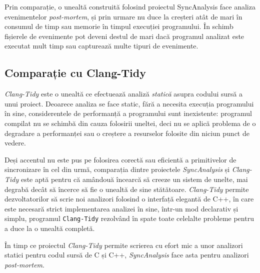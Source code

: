 Prin comparație, o unealtă construită folosind proiectul SyncAnalysis
face analiza evenimentelor \textit{post-mortem}, și prin urmare nu duce
la creșteri atât de mari în consumul de timp sau memorie în timpul
execuției programului. În schimb fișierele de evenimente pot deveni
destul de mari dacă programul analizat este executat mult timp sau
capturează multe tipuri de evenimente.

\subsection{Comparație cu Clang-Tidy}
\textit{Clang-Tidy}\cite{ClangTidy} este o unealtă ce efectuează analiză
\textit{statică} asupra codului sursă a unui proiect. Deoarece analiza
se face static, fără a necesita execuția programului în sine,
considerentele de performanță a programului sunt inexistente: programul
compilat nu se schimbă din cauza folosirii uneltei, deci nu se aplică
problema de o degradare a performanței sau o creștere a resurselor
folosite din niciun punct de vedere.

Deși accentul nu este pus pe folosirea corectă sau eficientă a
primitivelor de sincronizare în cel din urmă, comparația dintre
proiectele \textit{SyncAnalysis} și \textit{Clang-Tidy} este aptă pentru
că amândouă încearcă să creeze un sistem de unelte, mai degrabă decât
să încerce să fie o unealtă de sine stătătoare. \textit{Clang-Tidy}
permite dezvoltatorilor să scrie noi analizori folosind o interfață
elegantă de C++, în care este necesară strict implementarea analizei în
sine, într-un mod declarativ și simplu, programul \lstinline{Clang-Tidy}
rezolvând în spate toate celelalte probleme pentru a duce la o unealtă
completă.

În timp ce proiectul \textit{Clang-Tidy} permite scrierea cu efort mic a
unor analizori statici pentru codul sursă de C și C++,
\textit{SyncAnalysis} face asta pentru analizori \textit{post-mortem}.
